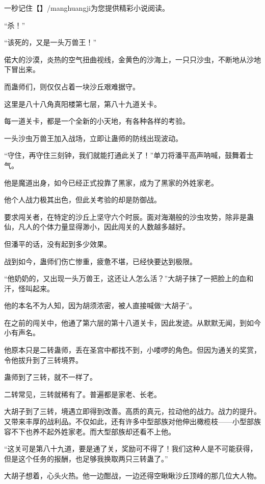 
\begin{this_body}

一秒记住【】/manghuangji为您提供精彩小说阅读。

“杀！”

“该死的，又是一头万兽王！”

偌大的沙漠，炎热的空气扭曲视线，金黄色的沙海上，一只只沙虫，不断地从沙地下冒出来。

而蛊师们，则仅仅占着一块沙丘艰难据守。

这里是八十八角真阳楼第七层，第八十九道关卡。

每一道关卡，都是一个全新的小天地，有各种各样的考验。

一头沙虫万兽王加入战场，立即让蛊师的防线出现波动。

“守住，再守住三刻钟，我们就能打通此关了！”单刀将潘平高声呐喊，鼓舞着士气。

他是魔道出身，如今已经正式投靠了黑家，成为了黑家的外姓家老。

他个人战力极其出色，但此关考验的却是防御战。

要求闯关者，在特定的沙丘上坚守六个时辰。面对海潮般的沙虫攻势，除非是蛊仙，凡人的个体力量显得渺小，因此闯关的人数越多越好。

但潘平的话，没有起到多少效果。

战到如今，蛊师们伤亡惨重，疲惫不堪，已经快要达到极限。

“他奶奶的，又出现一头万兽王，这还让人怎么活？”大胡子抹了一把脸上的血和汗，怪叫起来。

他的本名不为人知，因为胡须浓密，被人直接喊做“大胡子”。

在之前的闯关中，他通了第六层的第十八道关卡，因此发迹。从默默无闻，到如今小有声名。

他原本只是二转蛊师，丢在圣宫中都找不到，小喽啰的角色。但因为通关的奖赏，令他拔升到了三转境界。

蛊师到了三转，就不一样了。

二转常见，三转就稀有了。普遍都是家老、长老。

大胡子到了三转，境遇立即得到改善。高质的真元，拉动他的战力。战力的提升。又带来丰厚的战利品。不仅如此，还有许多中型部族对他伸出橄榄枝——小型部族容不下也养不起外姓家老。而大型部族却还看不上他。

“这关可是第八十九道，要是通了关，奖励可不得了！我们这种人是不可能获得，但是这个任务的报酬，也足够我换取两只三转蛊了。”

大胡子想着，心头火热。他一边酣战，一边还得空瞅瞅沙丘顶峰的那几位大人物。


\end{this_body}
